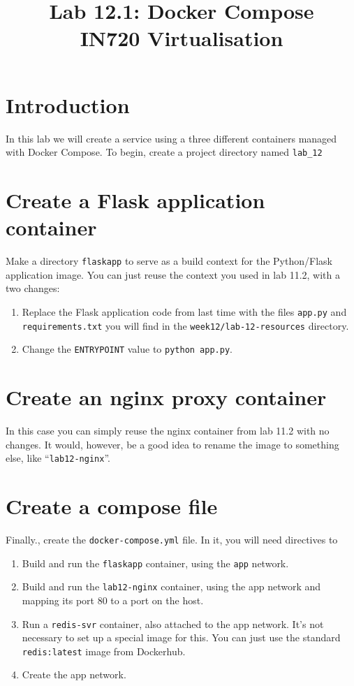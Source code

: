 \documentclass{article}
\begin{document}
\title{Lab 12.1: Docker Compose\\IN720 Virtualisation}
\date{}
\maketitle

\section*{Introduction}
In this lab we will create a service using a three different containers managed with Docker Compose. To begin, create a project directory named \texttt{lab\_12}

\section{Create a Flask application container}
Make a directory \texttt{flaskapp} to serve as a build context for the Python/Flask application image. You can just reuse the context you used in lab 11.2, with a two changes:

  \begin{enumerate}
    \item Replace the Flask application code from last time with the files \texttt{app.py} and \texttt{requirements.txt} you will find in the \texttt{week12/lab-12-resources} directory.
    \item Change the \texttt{ENTRYPOINT} value to \texttt{python app.py}.
    \end{enumerate}

\section{Create an nginx proxy container}
In this case you can simply reuse the nginx container from lab 11.2 with no changes. It would, however, be a good idea to rename the image to something else, like ``\texttt{lab12-nginx}''.

\section{Create a compose file}
Finally., create the \texttt{docker-compose.yml} file. In it, you will need directives to

\begin{enumerate}
  \item Build and run the \texttt{flaskapp} container, using the \texttt{app} network.
  \item Build and run the \texttt{lab12-nginx} container, using the app network and mapping its port 80 to a port on the host.
  \item Run a \texttt{redis-svr} container, also attached to the app network. It's not necessary to set up a special image for this. You can just use the standard \texttt{redis:latest} image from Dockerhub.
  \item Create the app network.
  \end{enumerate}
\end{document}
